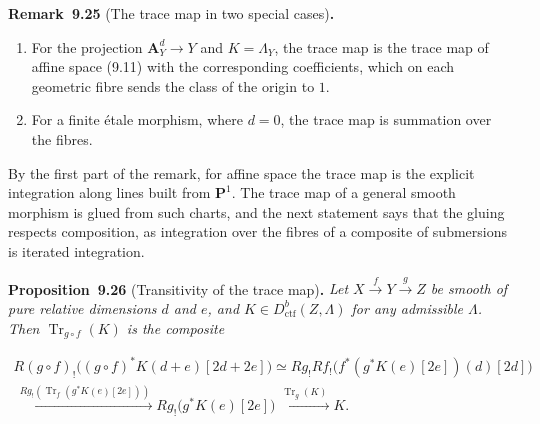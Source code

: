 \documentclass[11pt]{article}
\newenvironment{bpstatement}[2]{\par\addvspace{0.6\baselineskip}\noindent\textbf{#1}#2\textbf{.}\enspace\ignorespaces}
  {\par\addvspace{0.4\baselineskip}}
\newenvironment{bpstatementit}[2]{\begin{bpstatement}{#1}{#2}\itshape\ignorespaces}{\end{bpstatement}}
\begin{document}
\label{bp86}%
\begin{bpstatement}{Remark~9.25}{ (The trace map in two special cases)}
\begin{enumerate}
\item For the projection \(\mathbf A^d_Y\to Y\) and \(K=\Lambda_Y\), the trace map is the trace map of affine space (9.11) with the corresponding coefficients, which on each geometric fibre sends the class of the origin to \(1\).
\item For a finite étale morphism, where \(d=0\), the trace map is summation over the fibres.
\end{enumerate}
\end{bpstatement}

\label{bp87}%
By the first part of the remark, for affine space the trace map is the explicit integration along lines built from \(\mathbf P^1\). The trace map of a general smooth morphism is glued from such charts, and the next statement says that the gluing respects composition, as integration over the fibres of a composite of submersions is iterated integration.

\label{bp88}%
\begin{bpstatementit}{Proposition~9.26}{ (Transitivity of the trace map)}
Let \(X\xrightarrow{f}Y\xrightarrow{g}Z\) be smooth of pure relative dimensions \(d\) and \(e\), and \(K\in D^b_{\mathrm{ctf}}(Z,\Lambda)\) for any admissible \(\Lambda\). Then \(\operatorname{Tr}_{g\circ f}(K)\) is the composite

\[
\begin{gathered}
R(g\circ f)_!
\bigl((g\circ f)^{*}K(d+e)[2d+2e]\bigr)
\simeq Rg_!Rf_!
\bigl(f^{*}
(g^{*}K(e)[2e])(d)[2d]\bigr)\\
\xrightarrow{\ Rg_!
(\operatorname{Tr}_{f}(g^{*}K(e)[2e]))\ }
Rg_!\bigl(g^{*}K(e)[2e]\bigr)
\xrightarrow{\ \operatorname{Tr}_{g}(K)\ }K.
\end{gathered}
\]
\end{bpstatementit}
\end{document}
